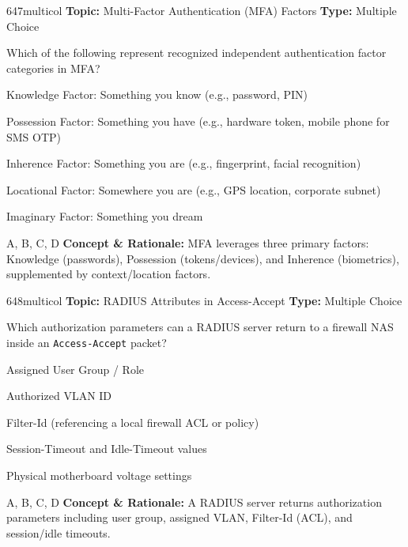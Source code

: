 \begin{qcard}{647}{multicol}
\textcolor{darkslate!75}{\small\textbf{Topic:} Multi-Factor Authentication (MFA) Factors \hfill \textbf{Type:} Multiple Choice}\vspace{0.4em}\par
Which of the following represent recognized independent authentication factor categories in MFA?
\begin{qoptions}
\item Knowledge Factor: Something you know (e.g., password, PIN)
\item Possession Factor: Something you have (e.g., hardware token, mobile phone for SMS OTP)
\item Inherence Factor: Something you are (e.g., fingerprint, facial recognition)
\item Locational Factor: Somewhere you are (e.g., GPS location, corporate subnet)
\item Imaginary Factor: Something you dream
\end{qoptions}
\end{qcard}
\nopagebreak
\begin{explainbox}{A, B, C, D}
\textbf{Concept \& Rationale:} MFA leverages three primary factors: Knowledge (passwords), Possession (tokens/devices), and Inherence (biometrics), supplemented by context/location factors.
\end{explainbox}

\begin{qcard}{648}{multicol}
\textcolor{darkslate!75}{\small\textbf{Topic:} RADIUS Attributes in Access-Accept \hfill \textbf{Type:} Multiple Choice}\vspace{0.4em}\par
Which authorization parameters can a RADIUS server return to a firewall NAS inside an \texttt{Access-Accept} packet?
\begin{qoptions}
\item Assigned User Group / Role
\item Authorized VLAN ID
\item Filter-Id (referencing a local firewall ACL or policy)
\item Session-Timeout and Idle-Timeout values
\item Physical motherboard voltage settings
\end{qoptions}
\end{qcard}
\nopagebreak
\begin{explainbox}{A, B, C, D}
\textbf{Concept \& Rationale:} A RADIUS server returns authorization parameters including user group, assigned VLAN, Filter-Id (ACL), and session/idle timeouts.
\end{explainbox}

